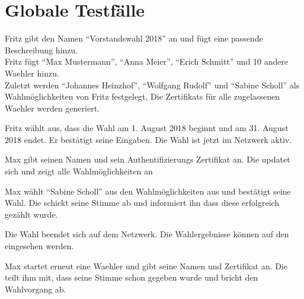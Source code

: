 \documentclass[parskip=full,11pt,twoside]{scrartcl}
\begin{document}
\section{Globale Testfälle}

		{Fritz gibt den Namen \enquote{Vorstandswahl 2018} an und fügt eine passende Beschreibung hinzu.\\
		Fritz fügt \enquote{Max Mustermann}, \enquote{Anna Meier}, \enquote{Erich Schmitt} und 10 andere \gls{Waehler} hinzu.\\
		Zuletzt werden \enquote{Johannes Heinzhof}, \enquote{Wolfgang Rudolf} und \enquote{Sabine Scholl} als Wahlmöglichkeiten von Fritz festgelegt,}
		{Die \glspl{Zertifikat} für alle zugelassenen \gls{Waehler} werden generiert.}	
	
\teststep{}
		{Fritz wählt aus, dass die \gls{Wahl} am 1. August 2018 beginnt und am 31. August 2018 endet. Er bestätigt seine Eingaben.}
		{Die \gls{Wahl} ist jetzt im \gls{Netzwerk} aktiv.}

		{Max gibt seinen Namen und sein Authentifizierungs \gls{Zertifikat} an.}
		{Die  updatet sich und zeigt alle Wahlmöglichkeiten an}
		
\teststep{}
		{Max wählt \enquote{Sabine Scholl} aus den Wahlmöglichkeiten aus und bestätigt seine Wahl.}
		{Die  schickt seine \gls{Stimme} ab und informiert ihn dass diese erfolgreich gezählt wurde.}
		
		{Die \gls{Wahl} beendet sich auf dem \gls{Netzwerk}.}
		{Die Wahlergebnisse können auf den  eingesehen werden.}
		
		{Max startet erneut eine \gls{Waehler}  und gibt seine Namen und \gls{Zertifikat} an.}
		{Die  teilt ihm mit, dass seine \gls{Stimme} schon gegeben wurde und bricht den Wahlvorgang ab.}
\end{document}

